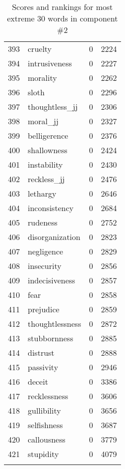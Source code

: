 \begin{longtable}[!htbp]{| rlr@{.}l |}
    393 & cruelty & 0 & 2224 \\
    394 & intrusiveness & 0 & 2227 \\
    395 & morality & 0 & 2262 \\
    396 & sloth & 0 & 2296 \\
    397 & thoughtless\_jj & 0 & 2306 \\
    398 & moral\_jj & 0 & 2327 \\
    399 & belligerence & 0 & 2376 \\
    400 & shallowness & 0 & 2424 \\
    401 & instability & 0 & 2430 \\
    402 & reckless\_jj & 0 & 2476 \\
    403 & lethargy & 0 & 2646 \\
    404 & inconsistency & 0 & 2684 \\
    405 & rudeness & 0 & 2752 \\
    406 & disorganization & 0 & 2823 \\
    407 & negligence & 0 & 2829 \\
    408 & insecurity & 0 & 2856 \\
    409 & indecisiveness & 0 & 2857 \\
    410 & fear & 0 & 2858 \\
    411 & prejudice & 0 & 2859 \\
    412 & thoughtlessness & 0 & 2872 \\
    413 & stubbornness & 0 & 2885 \\
    414 & distrust & 0 & 2888 \\
    415 & passivity & 0 & 2946 \\
    416 & deceit & 0 & 3386 \\
    417 & recklessness & 0 & 3606 \\
    418 & gullibility & 0 & 3656 \\
    419 & selfishness & 0 & 3687 \\
    420 & callousness & 0 & 3779 \\
    421 & stupidity & 0 & 4079 \\
    \hline
    \caption{Scores and rankings for most extreme 30 words in component \#2} \\
\end{longtable}
